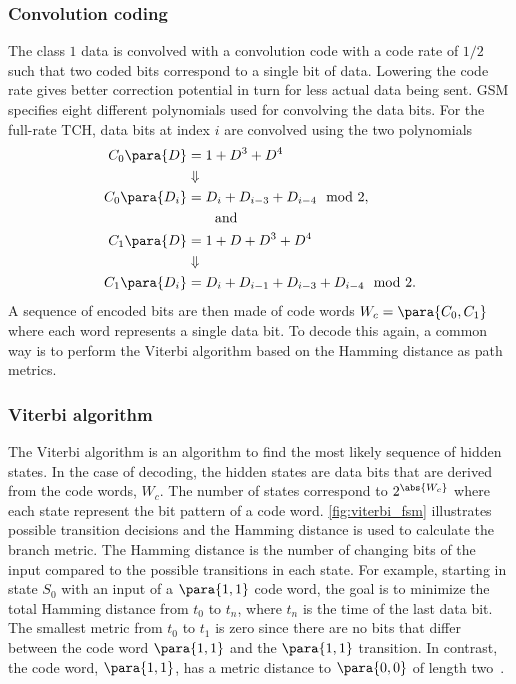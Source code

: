 \subsubsection{Convolution coding}
The class $1$ data is convolved with a convolution code with a code
rate of $1/2$ such that two coded bits correspond to a single bit of
data. Lowering the code rate gives better correction potential in turn
for less actual data being sent. \gls{GSM} specifies eight different
polynomials used for convolving the data bits. For the full-rate
\gls{TCH}, data bits at index $i$ are convolved using the two
polynomials
\begin{equation}
  \begin{aligned}
    C_0\para{D} &= 1 + D^3 + D^4\\
                &\Downarrow\\
    C_0\para{D_i} &= D_i + D_{i - 3} + D_{i - 4} \mod 2,\\
    & \qquad \text{and}\\
    C_1\para{D} &= 1 + D + D^3 + D^4\\
                &\Downarrow\\
    C_1\para{D_i} &= D_i + D_{i - 1} + D_{i - 3} + D_{i - 4} \mod 2.
  \end{aligned}
\end{equation}
A sequence of encoded bits are then made of code words $W_c =
\para{C_0, C_1}$ where each word represents a single data bit. To
decode this again, a common way is to perform the Viterbi algorithm
based on the Hamming distance as path metrics.

\subsubsection{Viterbi algorithm}
The Viterbi algorithm is an algorithm to find the most likely sequence
of hidden states. In the case of decoding, the hidden states are data
bits that are derived from the code words, $W_c$. The number of states
correspond to $2^{\abs{W_c}}$ where each state represent the bit
pattern of a code word. \cref{fig:viterbi_fsm} illustrates possible
transition decisions and the Hamming distance is used to calculate the
branch metric. The Hamming distance is the number of changing bits of
the input compared to the possible transitions in each state. For
example, starting in state $S_0$ with an input of a $\para{1,1}$ code
word, the goal is to minimize the total Hamming distance from $t_0$ to
$t_n$, where $t_n$ is the time of the last data bit. The smallest
metric from $t_0$ to $t_1$ is zero since there are no bits that differ
between the code word $\para{1,1}$ and the $\para{1, 1}$
transition. In contrast, the code word, $\para{1,1}$, has a metric
distance to $\para{0, 0}$ of length
two~\cite[p. 235--239]{principledigcom}.

